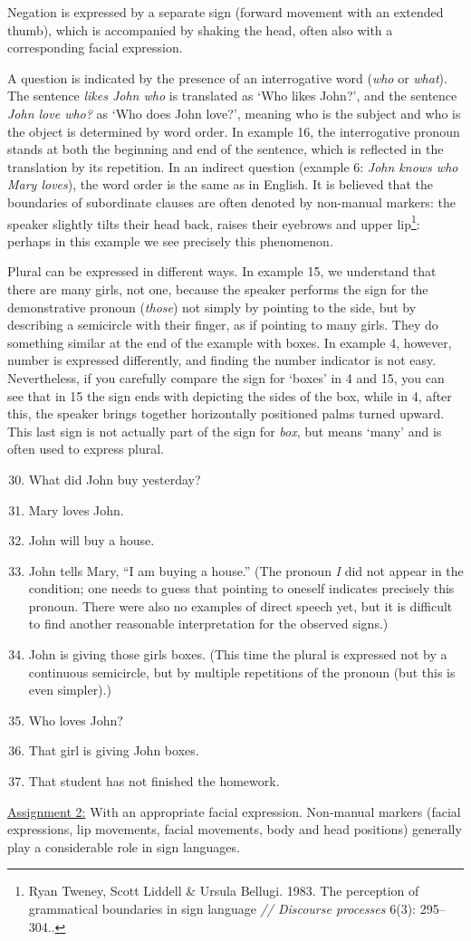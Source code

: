 \documentclass[12pt]{article}
\begin{document}
Negation is expressed by a separate sign (forward movement with an extended thumb), which is accompanied by shaking the head, often also with a corresponding facial expression.

A question is indicated by the presence of an interrogative word (\textit{who} or \textit{what}).
The sentence \textit{likes John who} is translated as `Who likes John?', and the sentence \textit{John love who?} as `Who does John love?', meaning who is the subject and who is the object is determined by word order.
In example 16, the interrogative pronoun stands at both the beginning and end of the sentence, which is reflected in the translation by its repetition. In an indirect question (example 6: \textit{John knows who Mary loves}), the word order is the same as in English.
It is believed that the boundaries of subordinate clauses are often denoted by non-manual markers:
the speaker slightly tilts their head back, raises their eyebrows and upper lip\footnote{Ryan Tweney, Scott Liddell \& Ursula Bellugi. 1983. The perception of grammatical boundaries in sign language \textit{// Discourse processes} 6(3): 295--304..}:
perhaps in this example we see precisely this phenomenon.

Plural can be expressed in different ways. In example 15, we understand that there are many girls, not one, because the speaker performs the sign for the demonstrative pronoun (\textit{those}) not simply by pointing to the side, but by describing a semicircle with their finger, as if pointing to many girls.
They do something similar at the end of the example with boxes.
In example 4, however, number is expressed differently, and finding the number indicator is not easy.
Nevertheless, if you carefully compare the sign for `boxes' in 4 and 15, you can see that in 15 the sign ends with depicting the sides of the box, while in 4, after this, the speaker brings together horizontally positioned palms turned upward.
This last sign is not actually part of the sign for \textit{box}, but means `many' and is often used to express plural.

\begin{enumerate}\setcounter{enumi}{29}
    \item What did John buy yesterday?
    \item Mary loves John.
    \item John will buy a house.
    \item John tells Mary, ``I am buying a house.''
    (The pronoun \textit{I} did not appear in the condition; one needs to guess that pointing to oneself indicates precisely this pronoun.
    There were also no examples of direct speech yet, but it is difficult to find another reasonable interpretation for the observed signs.)
    \item John is giving those girls boxes.
    (This time the plural is expressed not by a continuous semicircle, but by multiple repetitions of the pronoun (but this is even simpler).)
    \item Who loves John?
    \item That girl is giving John boxes.
    \item That student has not finished the homework.
\end{enumerate}

\bigskip

\noindent\underline{Assignment 2:}
With an appropriate facial expression.
Non-manual markers (facial expressions, lip movements, facial movements, body and head positions) generally play a considerable role in sign languages.

\bigskip
\end{document}
